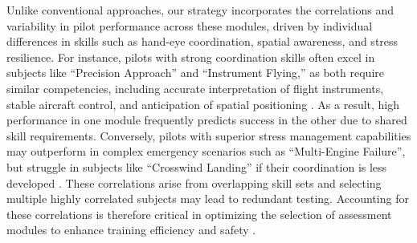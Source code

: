 \documentclass[opre,sglanonrev]{informs4}
\begin{document}
Unlike conventional approaches, our strategy incorporates the correlations and variability in pilot performance across these modules, driven by individual differences in skills such as hand-eye coordination, spatial awareness, and stress resilience. For instance, pilots with strong coordination skills often excel in subjects like ``Precision Approach'' and ``Instrument Flying,'' as both require similar competencies, including accurate interpretation of flight instruments, stable aircraft control, and anticipation of spatial positioning \citep{Damos2003}. As a result, high performance in one module frequently predicts success in the other due to shared skill requirements. Conversely, pilots with superior stress management capabilities may outperform in complex emergency scenarios such as ``Multi-Engine Failure'', but struggle in subjects like ``Crosswind Landing'' if their coordination is less developed \citep{Szczepanska2025}. These correlations arise from overlapping skill sets and selecting multiple highly correlated subjects may lead to redundant testing.%
 Accounting for these correlations is therefore critical in optimizing the selection of assessment modules to enhance training efficiency and safety \citep{Duruaku2024}. 
\end{document}
